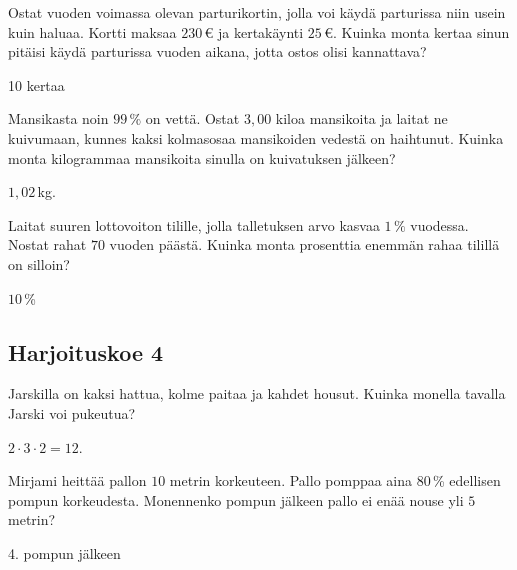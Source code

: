 	\begin{tehtava}
Ostat vuoden voimassa olevan parturikortin, jolla voi käydä parturissa niin usein kuin haluaa. Kortti maksaa $230$\,€ ja kertakäynti $25$\,€. Kuinka monta kertaa sinun pitäisi käydä parturissa vuoden aikana, jotta ostos olisi kannattava?
	\begin{vastaus}
	 10 kertaa
	\end{vastaus}
	\end{tehtava}
	

	\begin{tehtava}
Mansikasta noin $99\,\%$ on vettä. Ostat $3,00$ kiloa mansikoita ja laitat ne kuivumaan, kunnes kaksi kolmasosaa mansikoiden vedestä on haihtunut. Kuinka monta kilogrammaa mansikoita sinulla on kuivatuksen jälkeen?
	\begin{vastaus}
	 $1,02$\,kg.
	\end{vastaus}
	\end{tehtava}
	
	\begin{tehtava}
Laitat suuren lottovoiton tilille, jolla talletuksen arvo kasvaa $1\,\%$ vuodessa. Nostat rahat $70$ vuoden päästä. Kuinka monta prosenttia enemmän rahaa tilillä on silloin?
	\begin{vastaus}
	 $10$\,\%
	\end{vastaus}
	\end{tehtava}
	
\subsection*{Harjoituskoe 4}
	
	\begin{tehtava}
Jarskilla on kaksi hattua, kolme paitaa ja kahdet housut. Kuinka monella tavalla Jarski voi pukeutua?
	 \begin{vastaus}
	  $2 \cdot 3 \cdot 2 = 12$.
	 \end{vastaus}
	 \end{tehtava}
	 
	\begin{tehtava}
Mirjami heittää pallon $10$ metrin korkeuteen. Pallo pomppaa aina $80$\,\% edellisen pompun korkeudesta. Monennenko pompun jälkeen pallo ei enää nouse yli $5$ metrin?
	\begin{vastaus}
	 4. pompun jälkeen
	\end{vastaus}
	\end{tehtava}
	
